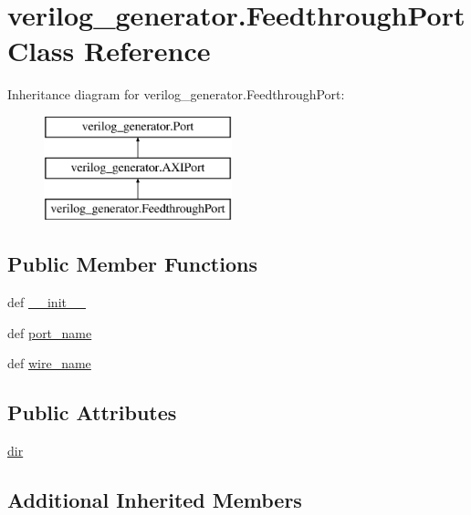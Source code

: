 \hypertarget{classverilog__generator_1_1FeedthroughPort}{\section{verilog\-\_\-generator.\-Feedthrough\-Port Class Reference}
\label{classverilog__generator_1_1FeedthroughPort}
}
Inheritance diagram for verilog\-\_\-generator.\-Feedthrough\-Port\-:\begin{figure}[H]
\begin{center}
\leavevmode
\includegraphics[height=3.000000cm]{classverilog__generator_1_1FeedthroughPort}
\end{center}
\end{figure}
\subsection*{Public Member Functions}
\begin{DoxyCompactItemize}
\item 
def \hyperlink{classverilog__generator_1_1FeedthroughPort_a7cf6834ae2da6dc67e70627eef8a7ed7}{\-\_\-\-\_\-init\-\_\-\-\_\-}
\item 
def \hyperlink{classverilog__generator_1_1FeedthroughPort_aaeaf2973a00aaf3d06525b2e9a508197}{port\-\_\-name}
\item 
def \hyperlink{classverilog__generator_1_1FeedthroughPort_af97681b3a72f75e91b9c4f25ad185509}{wire\-\_\-name}
\end{DoxyCompactItemize}
\subsection*{Public Attributes}
\begin{DoxyCompactItemize}
\item 
\hyperlink{classverilog__generator_1_1FeedthroughPort_acbb2b180844c87406724b2cf8f26de8d}{dir}
\end{DoxyCompactItemize}
\subsection*{Additional Inherited Members}


